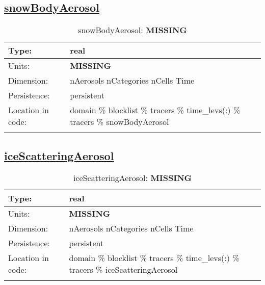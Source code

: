 \subsection[snowBodyAerosol]{\hyperref[sec:var_tab_tracers]{snowBodyAerosol}}
\label{subsec:var_sec_tracers_snowBodyAerosol}
\begin{center}
\begin{longtable}{| p{2.0in} | p{4.0in} |}
        \hline 
        Type: & real \\
        \hline 
        Units: & {\bf \color{red} MISSING} \\
        \hline 
        Dimension: & nAerosols nCategories nCells Time \\
        \hline 
        Persistence: & persistent \\
        \hline 
         Location in code: & domain \% blocklist \% tracers \% time\_levs(:) \% tracers \% snowBodyAerosol \\
         \hline 
    \caption{snowBodyAerosol: {\bf \color{red} MISSING}}
\end{longtable}
\end{center}
\subsection[iceScatteringAerosol]{\hyperref[sec:var_tab_tracers]{iceScatteringAerosol}}
\label{subsec:var_sec_tracers_iceScatteringAerosol}
\begin{center}
\begin{longtable}{| p{2.0in} | p{4.0in} |}
        \hline 
        Type: & real \\
        \hline 
        Units: & {\bf \color{red} MISSING} \\
        \hline 
        Dimension: & nAerosols nCategories nCells Time \\
        \hline 
        Persistence: & persistent \\
        \hline 
         Location in code: & domain \% blocklist \% tracers \% time\_levs(:) \% tracers \% iceScatteringAerosol \\
         \hline 
    \caption{iceScatteringAerosol: {\bf \color{red} MISSING}}
\end{longtable}
\end{center}
